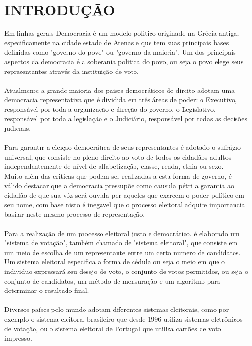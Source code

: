 \section{INTRODUÇÃO}
Em linhas gerais Democracia é um modelo politico originado na Grécia antiga, 
especificamente na cidade estado de Atenas e que tem suas principais bases 
definidas como "governo do povo" ou "governo da maioria". Um dos principais aspectos
da democracia é a soberania politica do povo, ou seja o povo elege seus representantes
através da instituição de voto. \\ \\
Atualmente a grande maioria dos paises democráticos de direito adotam uma 
democracia representativa que é dividida em três áreas de poder: o Executivo, responsável por toda a organização
e direção do governo, o Legislativo, responsável por toda a legislação e o Judiciário,
responsável por todas as decisões judiciais. \\ \\
Para garantir a eleição democrática de seus representantes é adotado o sufrágio 
universal, que consiste no pleno direito ao voto de todos os cidadãos adultos 
independentemente de nível de alfabetização, classe, renda, etnia ou sexo. \\
Muito além das criticas que podem ser realizadas a esta forma de governo, é válido
destacar que a democracia pressupõe como causula pétri a garantia ao cidadão de
que sua vóz será ouvida por aqueles que exercem o poder político em seu nome, 
com base nisto é inegavel que o processo eleitoral adquire importancia basilar
neste mesmo processo de representação. \\ \\
Para a realização de um processo eleitoral justo e democrático, é elaborado um 
"sistema de votação", também chamado de "sistema eleitoral", que consiste em um
meio de escolha de um representante entre um certo numero de candidatos. \\
Um sistema eleitoral especifica a forma de cédula ou seja o meio em que o individuo
expressará seu desejo de voto, o conjunto de votos permitidos, ou seja o conjunto 
de candidatos, um método de mensuração e um algoritmo para determinar o 
resultado final. \\ \\
Diversos países pelo mundo adotam diferentes sistemas eleitorais, como por exemplo
o sistema eleitoral brasileiro que desde 1996 utiliza sistemas eletrônicos de votação,
ou o sistema eleitoral de Portugal que utiliza cartões de voto impresso. \\
